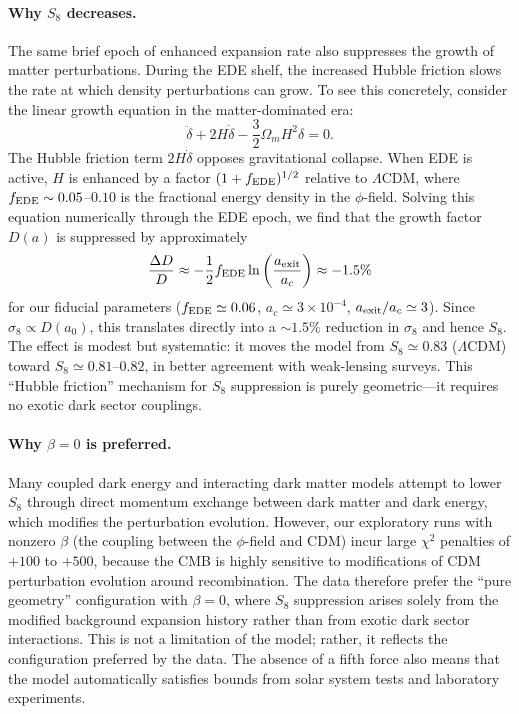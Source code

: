\documentclass[a4paper,11pt]{article}
\begin{document}
\paragraph{Why $S_8$ decreases.}
The same brief epoch of enhanced expansion rate also suppresses the growth of matter perturbations. During the EDE shelf, the increased Hubble friction slows the rate at which density perturbations can grow. To see this concretely, consider the linear growth equation in the matter-dominated era:
\begin{equation}
\ddot{\delta} + 2H\dot{\delta} - \frac{3}{2}\Omega_m H^2 \delta = 0.
\end{equation}
The Hubble friction term $2H\dot{\delta}$ opposes gravitational collapse. When EDE is active, $H$ is enhanced by a factor $(1 + f_{\rm EDE})^{1/2}$ relative to $\Lambda$CDM, where $f_{\rm EDE} \sim 0.05$--$0.10$ is the fractional energy density in the $\phi$-field. Solving this equation numerically through the EDE epoch, we find that the growth factor $D(a)$ is suppressed by approximately
\begin{equation}
\frac{\Delta D}{D} \approx -\frac{1}{2} f_{\rm EDE} \ln\left(\frac{a_{\rm exit}}{a_c}\right) \approx -1.5\%
\end{equation}
for our fiducial parameters ($f_{\rm EDE} \simeq 0.06$, $a_c \simeq 3 \times 10^{-4}$, $a_{\rm exit}/a_c \simeq 3$). Since $\sigma_8 \propto D(a_0)$, this translates directly into a $\sim 1.5\%$ reduction in $\sigma_8$ and hence $S_8$. The effect is modest but systematic: it moves the model from $S_8 \simeq 0.83$ ($\Lambda$CDM) toward $S_8 \simeq 0.81$--$0.82$, in better agreement with weak-lensing surveys. This ``Hubble friction'' mechanism for $S_8$ suppression is purely geometric---it requires no exotic dark sector couplings.

\paragraph{Why $\beta = 0$ is preferred.}
Many coupled dark energy and interacting dark matter models attempt to lower $S_8$ through direct momentum exchange between dark matter and dark energy, which modifies the perturbation evolution. However, our exploratory runs with nonzero $\beta$ (the coupling between the $\phi$-field and CDM) incur large $\chi^2$ penalties of $+100$ to $+500$, because the CMB is highly sensitive to modifications of CDM perturbation evolution around recombination. The data therefore prefer the ``pure geometry'' configuration with $\beta = 0$, where $S_8$ suppression arises solely from the modified background expansion history rather than from exotic dark sector interactions. This is not a limitation of the model; rather, it reflects the configuration preferred by the data. The absence of a fifth force also means that the model automatically satisfies bounds from solar system tests and laboratory experiments.
\end{document}
